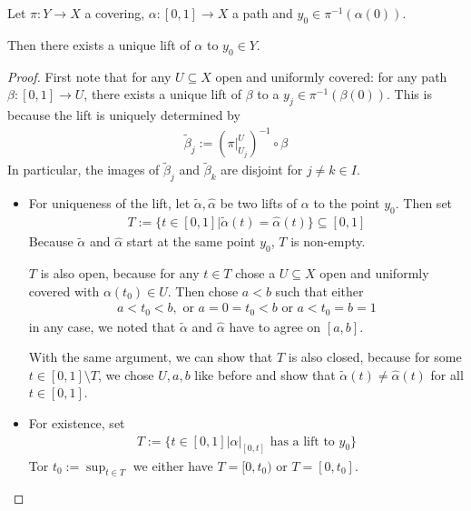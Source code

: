 \begin{lem}[]\label{lem:path-lift}
  Let $\pi: Y \to X$ a covering, $\alpha:[0,1] \to X$ a path and $y_0 \in \pi^{-1}(\alpha(0))$.
  
  Then there exists a unique lift of $\alpha$ to $y_0 \in Y$.
\end{lem}
\begin{proof}
  First note that for any $U \subseteq X$ open and uniformly covered: 
  for any path $\beta:[0,1] \to U$, there exists a unique lift of $\beta$ to a $y_j \in \pi^{-1}(\beta(0))$.
  This is because the lift is uniquely determined by
  \begin{align*}
    \tilde{\beta}_j := \left(
      \pi|_{U_j}^{U}
    \right)^{-1} \circ \beta
  \end{align*}
  In particular, the images of $\tilde{\beta}_j$ and $\tilde{\beta}_k$ are disjoint for $j \neq k \in I$.
  \begin{itemize}
    \item For uniqueness of the lift, let $\tilde{\alpha}, \hat{\alpha}$ be two lifts of $\alpha$ to the point $y_0$.
      Then set
      \begin{align*}
        T := \{t \in [0,1] \big\vert \tilde{\alpha}(t) = \hat{\alpha}(t)\} \subseteq [0,1]
      \end{align*}
      Because $\tilde{\alpha}$ and $\hat{\alpha}$ start at the same point $y_0$, $T$ is non-empty.

      $T$ is also open, because for any $t \in T$ chose a $U \subseteq X$ open and uniformly covered with $\alpha(t_0) \in U$.
      Then chose $a < b$ such that either
      \begin{align*}
        a < t_0 < b, \text{ or } a = 0 = t_0 < b \text{ or } a < t_0 = b = 1
      \end{align*}
      in any case, we noted that $\tilde{\alpha}$ and $\hat{\alpha}$ have to agree on $[a,b]$. 

      With the same argument, we can show that $T$ is also closed, because for some $t \in [0,1] \setminus T$, we chose $U,a,b$ like before and show that $\tilde{\alpha}(t) \neq \hat{\alpha}(t)$ for all $t \in [0,1]$.
    \item For existence, set
      \begin{align*}
        T := \{t \in [0,1] \big\vert \alpha|_{[0,t]} \text{ has a lift to $y_0$}\}
      \end{align*}
      Tor $t_0 := \sup_{t \in T}$ we either have $T = [0,t_0)$ or $T=[0,t_0]$.


\end{itemize}
\end{proof}
